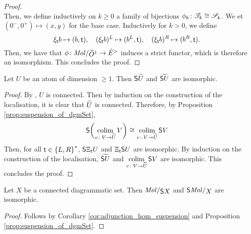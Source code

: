 \begin{proof}
\begin{equation*}
    \end{equation*}
    Then, we define inductively on \( k \geq 0 \) a family of bijections \( \phi_k \colon \mathscr{T}_k \cong \mathscr{S}_k \). 
    We et \( (0^-, 0^+) \mapsto (x, y) \) for the base case. 
    Inductively for \( k > 0 \), we define
    \begin{equation*}
        \xi_{\mathsf{t}}b \mapsto (b, \mathsf{t}),\quad (\xi_{\mathsf{t}}b)^L \mapsto (b^L, \mathsf{t}),\quad (\xi_{\mathsf{t}}b)^R \mapsto (b^R, \mathsf{t}).
    \end{equation*}
    Then, we have that \( \phi \colon \molecin{\rglobe{1}} \to \swE \) induces a strict functor, which is therefore an isomorphism.
    This concludes the proof.
\end{proof}

\begin{lem} \label{lem:suspension_commute_selfloc}
    Let \( U \) be an atom of dimension \( \geq 1 \).
    Then \( \mathsf{S}{\widetilde{U}} \) and \( \widetilde{\mathsf{S}{U}} \) are isomorphic. 
\end{lem}
\begin{proof}
    By \cite[Lemma 3.3.13]{hadzihasanovic2024combinatorics}, \( U \) is connected.
    Then by induction on the construction of the localisation, it is clear that \( \widetilde{U} \) is connected.
    Therefore, by Proposition \ref{prop:suspension_of_dgmSet}, 
    \begin{equation*}
        \mathsf{S}{\left(\operatorname*{colim}_{v \colon V \to \widetilde{U}} V\right)} \cong \operatorname*{colim}_{v \colon V \to \widetilde{U}} \mathsf{S}{V}
    \end{equation*}
    Then, for all \( \mathsf{t} \in \left\{ {L, R} \right\}^* \), \( \mathsf{S}{\Xi_{\mathsf{t}}U} \) and \( \Xi_{\mathsf{t}} \mathsf{S}{U} \) are isomorphic.
    By induction on the construction of the localisation, \( \widetilde{\mathsf{S}{U}} \) and \( \operatorname*{colim}\limits_{v \colon V \to \widetilde{U}} \mathsf{S}{V} \) are isomorphic.    
    This concludes the proof.
\end{proof}

\begin{lem} \label{lem:sus_commute_molec_connected}
    Let \( X \) be a connected diagrammatic set.
    Then \( \molecin{\sus{X}} \) and \( \sus{\molecin{X}} \) are isomorphic.
\end{lem}
\begin{proof}
    Follows by Corollary \ref{cor:adjunction_hom_suspension} and Proposition \ref{prop:suspension_of_dgmSet}. 
\end{proof}

